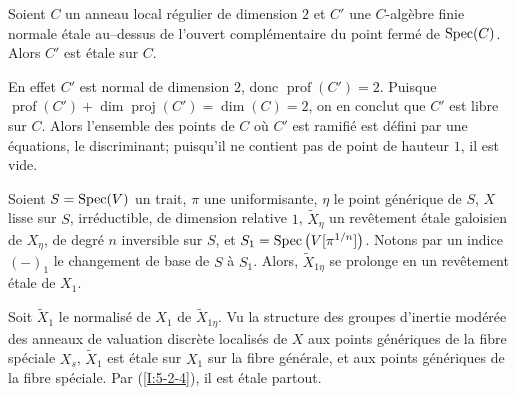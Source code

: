 \documentclass[oneside]{book}
\begin{document}
\begin{lemma} \label{I:5-2-4} %
Soient $C$ un anneau local régulier de dimension $2$ et $C'$ une $C$-algèbre 
finie normale étale au--dessus de l'ouvert complémentaire du point fermé 
de $\operatorname{Spec}(C)$. Alors $C'$ est étale sur $C$.
\end{lemma}

En effet $C'$ est normal de dimension $2$, donc $\operatorname{prof}(C')=2$. 
Puisque $\operatorname{prof}(C')+\dim\operatorname{proj}(C') = \dim(C)=2$, on 
en conclut que $C'$ est libre sur $C$. Alors l'ensemble des points de $C$ où 
$C'$ est ramifié est défini par une équations, le discriminant; puisqu'il 
ne contient pas de point de hauteur $1$, il est vide. 





\begin{lemma}\label{I:5-2-5} %
Soient $S=\operatorname{Spec}(V)$ un trait, $\pi$ une uniformisante, $\eta$ le point 
générique de $S$, $X$ lisse sur $S$, irréductible, de dimension 
relative $1$, $\widetilde X_\eta$ un revêtement étale galoisien de $X_\eta$, 
de degré $n$ inversible sur $S$, et $S_1=\operatorname{Spec}\left(V[\pi^{1/n}]\right)$. 
Notons par un indice $(-)_1$ le changement de base de $S$ à $S_1$. Alors, 
$\widetilde X_{1\eta}$ se prolonge en un revêtement étale de $X_1$. 
\end{lemma}

Soit $\widetilde X_1$ le normalisé de $X_1$ de $\widetilde X_{1\eta}$. Vu la 
structure des groupes d'inertie modérée des anneaux de valuation discrète 
localisés de $X$ aux points génériques de la fibre spéciale $X_s$, 
$\widetilde X_1$ est étale sur $X_1$ sur la fibre générale, et aux points 
génériques de la fibre spéciale. Par (\ref{I:5-2-4}), il est étale 
partout. 





\subsubsection{}\label{I:5-2-6} %
\end{document}
